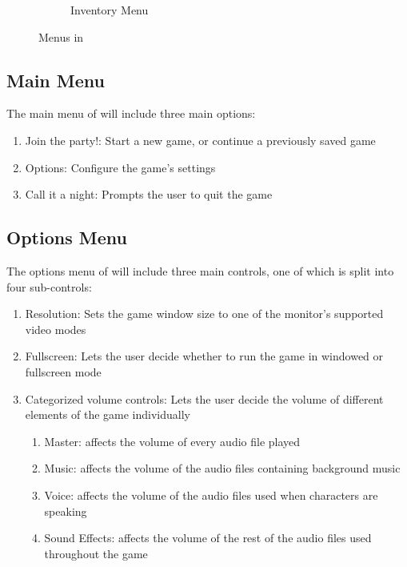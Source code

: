 \begin{figure}[htb]
\begin{subfigure}{.33\textwidth}
    \caption{Inventory Menu}
    \label{fig:menu_inventory}
  \end{subfigure}
  \caption{Menus in \ourgame{}}
  \label{fig:menus}
\end{figure}

\subsection{Main Menu}
The main menu of \ourgame{} will include three main options:
\begin{enumerate}
\item{Join the party!: Start a new game, or continue a previously saved game}
\item{Options: Configure the game's settings}
\item{Call it a night: Prompts the user to quit the game}
\end{enumerate}

\subsection{Options Menu}
The options menu of \ourgame{} will include three main controls, one of which is split into four sub-controls: 
\begin{enumerate}
\item{Resolution: Sets the game window size to one of the monitor's supported video modes}
\item{Fullscreen: Lets the user decide whether to run the game in windowed or fullscreen mode}
\item{Categorized volume controls: Lets the user decide the volume of different elements of the game individually
\begin{enumerate}
	\item{Master: affects the volume of every audio file played}
	\item{Music: affects the volume of the audio files containing background music}
	\item{Voice: affects the volume of the audio files used when characters are speaking}
	\item{Sound Effects: affects the volume of the rest of the audio files used throughout the game}
\end{enumerate}}
\end{enumerate}

